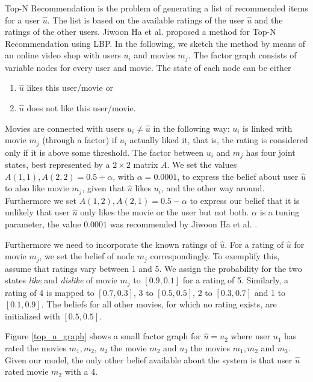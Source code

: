 Top-N Recommendation is the problem of generating a list of recommended items for a user $\hat u$. The list is based on the available ratings of the user $\hat u$ and the ratings of the other users. Jiwoon Ha et al. \cite{Ha:2012:TRT:2396761.2398636} proposed a method for Top-N Recommendation using LBP. In the following, we sketch the method by means of an online video shop with users $u_i$ and movies $m_j$. The factor graph consists of variable nodes for every user and movie. The state of each node can be either
\begin{enumerate}
   \itemsep0em 
   \item $\hat u$ likes this user/movie or
   \item $\hat u$ does not like this user/movie.
\end{enumerate}
Movies are connected with users $u_i\neq \hat u$ in the following way: $u_i$ is linked with movie $m_j$ (through a factor) if $u_i$ actually liked it, that is, the rating is considered only if it is above some threshold. The factor between $u_i$ and $m_j$ has four joint states, best represented by a $2\times 2$ matrix $A$. We set the values $A(1,1), A(2,2) = 0.5 + \alpha$, with $\alpha = 0.0001$, to express the belief about user $\hat u$ to also like movie $m_j$, given that $\hat u$ likes $u_i$, and the other way around. Furthermore we set $A(1,2), A(2,1) = 0.5 - \alpha$ to express our belief that it is unlikely that user $\hat u$ only likes the movie or the user but not both. $\alpha$ is a tuning parameter, the value $0.0001$ was recommended by Jiwoon Ha et al. \cite{Ha:2012:TRT:2396761.2398636}.

Furthermore we need to incorporate the known ratings of $\hat u$. For a rating of $\hat u$ for movie $m_j$, we set the belief of node $m_j$ correspondingly. To exemplify this, assume that ratings vary between 1 and 5. We assign the probability for the two states \textit{like} and \textit{dislike} of movie $m_j$ to $[0.9,0.1]$ for a rating of 5. Similarly, a rating of 4 is mapped to $[0.7,0.3]$, 3 to $[0.5,0.5]$, 2 to $[0.3,0.7]$ and 1 to $[0.1,0.9]$. The beliefs for all other movies, for which no rating exists, are initialized with $[0.5,0.5]$.

Figure \ref{top_n_graph} shows a small factor graph for  $\hat u = u_2$ where user $u_1$ has rated the movies $m_1,m_2$, $u_2$ the movie $m_2$ and $u_3$ the movies $m_1,m_2$ and $m_3$. Given our model, the only other belief available about the system is that user $\hat u$ rated movie $m_2$ with a 4.

